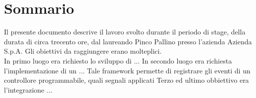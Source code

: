 
\cleardoublepage
{}
{}
\begingroup
\let\clearpage\relax
\let\cleardoublepage\relax
\let\cleardoublepage\relax

\chapter*{Sommario}

Il presente documento descrive il lavoro svolto durante il periodo di stage, della durata di circa trecento ore, dal laureando Pinco Pallino presso l'azienda Azienda S.p.A.
Gli obiettivi da raggiungere erano molteplici.\\
In primo luogo era richiesto lo sviluppo di ...
In secondo luogo era richiesta l'implementazione di un ... 
Tale framework permette di registrare gli eventi di un controllore programmabile, quali segnali applicati 
Terzo ed ultimo obbiettivo era l'integrazione ...

%
%

\endgroup			

\vfill

